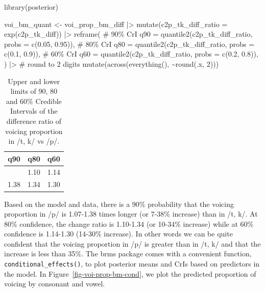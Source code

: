 \documentclass[
  authoryear,
  preprint,
  3p]{elsarticle}
\newenvironment{Shaded}{\begin{snugshade}}{\end{snugshade}}
\newcommand{\AttributeTok}[1]{\textcolor[rgb]{0.40,0.45,0.13}{#1}}
\newcommand{\CommentTok}[1]{\textcolor[rgb]{0.37,0.37,0.37}{#1}}
\newcommand{\DecValTok}[1]{\textcolor[rgb]{0.68,0.00,0.00}{#1}}
\newcommand{\FloatTok}[1]{\textcolor[rgb]{0.68,0.00,0.00}{#1}}
\newcommand{\FunctionTok}[1]{\textcolor[rgb]{0.28,0.35,0.67}{#1}}
\newcommand{\NormalTok}[1]{\textcolor[rgb]{0.00,0.23,0.31}{#1}}
\newcommand{\OtherTok}[1]{\textcolor[rgb]{0.00,0.23,0.31}{#1}}
\newcommand{\SpecialCharTok}[1]{\textcolor[rgb]{0.37,0.37,0.37}{#1}}
\begin{document}
\begin{Shaded}
\begin{Highlighting}[]
\FunctionTok{library}\NormalTok{(posterior)}

\NormalTok{voi\_bm\_quant }\OtherTok{\textless{}{-}}\NormalTok{ voi\_prop\_bm\_diff }\SpecialCharTok{|\textgreater{}} 
  \FunctionTok{mutate}\NormalTok{(}\AttributeTok{c2p\_tk\_diff\_ratio =} \FunctionTok{exp}\NormalTok{(c2p\_tk\_diff)) }\SpecialCharTok{|\textgreater{}} 
  \FunctionTok{reframe}\NormalTok{(}
    \CommentTok{\# 90\% CrI}
    \AttributeTok{q90 =} \FunctionTok{quantile2}\NormalTok{(c2p\_tk\_diff\_ratio, }\AttributeTok{probs =} \FunctionTok{c}\NormalTok{(}\FloatTok{0.05}\NormalTok{, }\FloatTok{0.95}\NormalTok{)),}
    \CommentTok{\# 80\% CrI}
    \AttributeTok{q80 =} \FunctionTok{quantile2}\NormalTok{(c2p\_tk\_diff\_ratio, }\AttributeTok{probs =} \FunctionTok{c}\NormalTok{(}\FloatTok{0.1}\NormalTok{, }\FloatTok{0.9}\NormalTok{)),}
    \CommentTok{\# 60\% CrI}
    \AttributeTok{q60 =} \FunctionTok{quantile2}\NormalTok{(c2p\_tk\_diff\_ratio, }\AttributeTok{probs =} \FunctionTok{c}\NormalTok{(}\FloatTok{0.2}\NormalTok{, }\FloatTok{0.8}\NormalTok{)),}
\NormalTok{  ) }\SpecialCharTok{|\textgreater{}} 
  \CommentTok{\# round to 2 digits}
  \FunctionTok{mutate}\NormalTok{(}\FunctionTok{across}\NormalTok{(}\FunctionTok{everything}\NormalTok{(), }\SpecialCharTok{\textasciitilde{}}\FunctionTok{round}\NormalTok{(.x, }\DecValTok{2}\NormalTok{)))}
\end{Highlighting}
\end{Shaded}

\begin{longtable}[]{@{}rrr@{}}

\caption{\label{tbl-voi-bm-quant}Upper and lower limits of 90, 80 and
60\% Credible Intervals of the difference ratio of voicing proportion in
/t, k/ vs /p/.}

\tabularnewline

\toprule\noalign{}
q90 & q80 & q60 \\
\midrule\noalign{}
\endhead
\bottomrule\noalign{}
\endlastfoot
1.07 & 1.10 & 1.14 \\
1.38 & 1.34 & 1.30 \\

\end{longtable}

Based on the model and data, there is a 90\% probability that the
voicing proportion in /p/ is 1.07-1.38 times longer (or 7-38\% increase)
than in /t, k/. At 80\% confidence, the change ratio is 1.10-1.34 (or
10-34\% increase) while at 60\% confidence is 1.14-1.30 (14-30\%
increase). In other words we can be quite confident that the voicing
proportion in /p/ is greater than in /t, k/ and that the increase is
less than 35\%. The brms package comes with a convenient function,
\texttt{conditional\_effects()}, to plot posterior means and CrIs based
on predictors in the model. In Figure~\ref{fig-voi-prop-bm-cond}, we
plot the predicted proportion of voicing by consonant and vowel.
\end{document}
